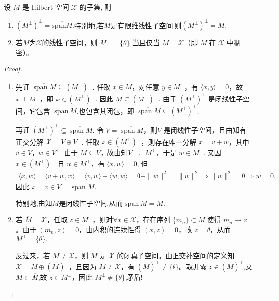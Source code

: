 \documentclass[../../main.tex]{subfiles}%
\begin{document}
\begin{proposition}\label{proposition:Hilbert空间稠密线性空间正交补为0}
设 $M$ 是 Hilbert 空间 $\mathscr{X}$ 的子集, 则
\begin{enumerate}[(1)]
\item\label{proposition:Hilbert空间稠密线性空间正交补为0-1} $(M^\perp)^\perp=\overline{\text{span}M}.$特别地,若$M$是有限维线性子空间,则$(M^\perp)^\perp=M$.

\item\label{proposition:Hilbert空间稠密线性空间正交补为0-2} 若$M$为$\mathscr{X}$的线性子空间，则
$M^\perp = \{\theta\}$ 当且仅当 $\overline{M} = \mathscr{X}$（即 $M$ 在 $\mathscr{X}$ 中稠密）。
\end{enumerate}
\end{proposition}
\begin{proof}
\begin{enumerate}[(1)]
\item 先证 $\overline{\operatorname{span}M}\subseteq (M^\perp)^\perp$. 
任取 $x\in M$，对任意 $y\in M^\perp$，有 $\langle x,y\rangle=0$，故 $x\perp M^\perp$，即 $x\in (M^\perp)^\perp$. 
因此 $M\subseteq (M^\perp)^\perp$. 
由于 $(M^\perp)^\perp$ 是闭线性子空间，它包含 $\operatorname{span}M$,也包含其闭包，即 $\overline{\operatorname{span}M}\subseteq (M^\perp)^\perp$.

再证 $(M^\perp)^\perp\subseteq \overline{\operatorname{span}M}$. 
令 $V=\overline{\operatorname{span}M}$，则$V$ 是闭线性子空间，且由知有正交分解 $\mathscr{X}=V\oplus V^\perp$. 
任取 $x\in (M^\perp)^\perp$，则存在唯一分解 $x=v+w$，其中 $v\in V$，$w\in V^\perp$. 
由于 $M\subseteq V$，故由知$V^\perp\subseteq M^\perp$，于是 $w\in M^\perp$. 
又因 $x\in (M^\perp)^\perp$ 且 $w\in M^\perp$，有 $\langle x,w\rangle=0$. 
但
\begin{align*}
\langle x,w\rangle=\langle v+w,w\rangle=\langle v,w\rangle+\langle w,w\rangle=0+\|w\|^2=\|w\|^2\Longrightarrow \|w\|^2=0\Longrightarrow w=0.
\end{align*}
因此 $x=v\in V=\overline{\operatorname{span}M}$. 

特别地,由知$M$是闭线性子空间,从而$\overline{\operatorname{span}M}=M$.

\item 若 $\overline{M} = \mathscr{X}$，任取 $z \in M^\perp$，则对$\forall x \in \mathscr{X}$，存在序列 $\{m_n\} \subset M$ 使得 $m_n \to x$。由于 $(m_n, z)=0$，由\hyperref[proposition:内积的连续性]{内积的连续性}得 $(x, z)=0$，故 $z=\theta$，从而 $M^\perp = \{\theta\}$.

反过来，若 $\overline{M} \ne \mathscr{X}$，则 $\overline{M}$ 是 $\mathscr{X}$ 的闭真子空间。由正交补空间的定义知$\mathscr{X} = \overline{M} \oplus (\overline{M})^\perp$，且因为 $\overline{M} \ne \mathscr{X}$，有 $(\overline{M})^\perp \ne \{\theta\}$。取非零 $z \in (\overline{M})^\perp$,又$M\subset \overline{M}$,故 $z \in M^\perp$，因此 $M^\perp \ne \{\theta\}$,矛盾!
\end{enumerate}
\end{proof}
\end{document}
